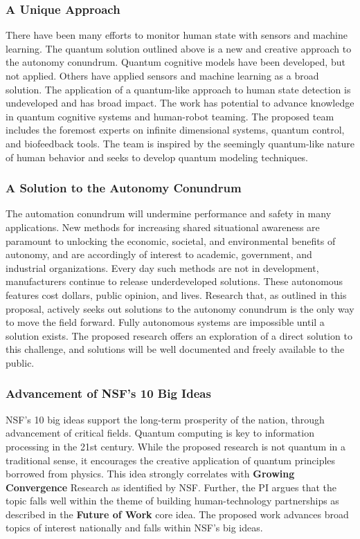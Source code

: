 \subsubsection{A Unique Approach}
There have been many efforts to monitor human state with sensors and machine learning. The quantum solution outlined above is a new and creative approach to the autonomy conundrum. Quantum cognitive models have been developed, but not applied. Others have applied sensors and machine learning as a broad solution. The application of a quantum-like approach to human state detection is undeveloped and has broad impact. The work has potential to advance knowledge in quantum cognitive systems and human-robot teaming. The proposed team includes the foremost experts on infinite dimensional systems, quantum control, and biofeedback tools. The team is inspired by the seemingly quantum-like nature of human behavior and seeks to develop quantum modeling techniques.
\subsubsection{A Solution to the Autonomy Conundrum}
The automation conundrum will undermine performance and safety in many applications. New methods for increasing shared situational awareness are paramount to unlocking the economic, societal, and environmental benefits of autonomy, and are accordingly of interest to academic, government, and industrial organizations. Every day such methods are not in development, manufacturers continue to release underdeveloped solutions. These autonomous features cost dollars, public opinion, and lives. Research that, as outlined in this proposal, actively seeks out solutions to the autonomy conundrum is the only way to move the field forward. Fully autonomous systems are impossible until a solution exists. The proposed research offers an exploration of a direct solution to this challenge, and solutions will be well documented and freely available to the public. 
\subsubsection{Advancement of NSF's 10 Big Ideas}
NSF’s 10 big ideas support the long-term prosperity of the nation, through advancement of critical fields. Quantum computing is key to information processing in the 21st century. While the proposed research is not quantum in a traditional sense, it encourages the creative application of quantum principles borrowed from physics. This idea strongly correlates with \textbf{Growing Convergence} Research as identified by NSF. Further, the PI argues that the topic falls well within the theme of building human-technology partnerships as described in the \textbf{Future of Work} core idea. The proposed work advances broad topics of interest nationally and falls within NSF’s big ideas.
